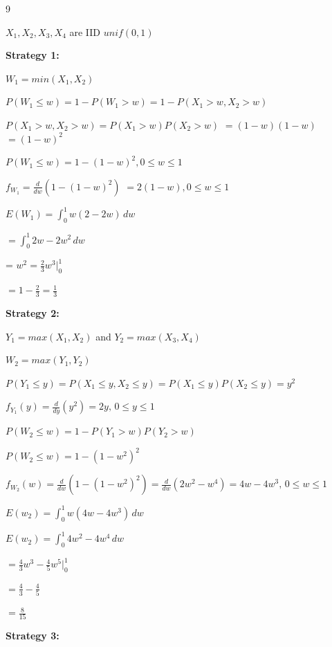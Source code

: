 \documentclass[12 pt]{article}
\begin{document}
    \begin{exercise}{9}
    \hfill

    $X_1, X_2, X_3, X_4$ are IID $unif(0,1)$

    \textbf{Strategy 1:}

    $W_1 = min(X_1, X_2)$

    $P(W_1 \leq w) = 1 - P(W_1 > w) = 1 - P(X_1 > w, X_2 > w)$

    $P(X_1 > w, X_2 > w) = P(X_1 > w) P(X_2 > w)$
    $= (1-w)(1-w)$
    $= (1-w)^2$

    $P(W_1 \leq w) = 1 - (1-w)^2, 0 \leq w \leq 1$

    $f_{W_1} = \frac{d}{dw}(1-(1-w)^2)$
    $= 2(1-w), 0 \leq w \leq 1$

    \hfill

    $E(W_1) = \int_{0}^{1} w (2-2w) \, dw$

    $ = \int_{0}^{1} 2w - 2w^2 \, dw$

    = $w^2 = \frac{2}{3}w^3 |_{0}^{1}$

    $= 1 - \frac{2}{3} = \frac{1}{3}$

    \hfill

    \textbf{Strategy 2:}

    $Y_1 = max(X_1, X_2)$ and $Y_2 = max(X_3, X_4)$

    $W_2 = max(Y_1, Y_2)$

    \hfill

    $P(Y_1 \leq y) = P(X_1 \leq y, X_2 \leq y) = P(X_1 \leq y)P(X_2 \leq y) = y^2$

    $f_{Y_1}(y) = \frac{d}{dy}(y^2) = 2y, \, 0 \leq y \leq 1$

    \hfill

    $P(W_2 \leq w) = 1 - P(Y_1 > w)P(Y_2 > w)$
    
    $P(W_2 \leq w) = 1 - (1-w^2)^2$

    $f_{W_2}(w) = \frac{d}{dw} (1-(1-w^2)^2) = \frac{d}{dw}(2w^2 - w^4) = 4w - 4w^3, \, 0 \leq w \leq 1$

    \hfill

    $E(w_2) = \int_{0}^{1} w(4w - 4w^3) \, dw$

    $E(w_2) = \int_{0}^{1} 4w^2 - 4w^4 \, dw$

    $ = \frac{4}{3} w^3 - \frac{4}{5}w^5 |_{0}^{1}$

    $= \frac{4}{3} - \frac{4}{5}$

    $= \frac{8}{15}$

    \hfill

    \textbf{Strategy 3:}


\end{exercise}
\end{document}
